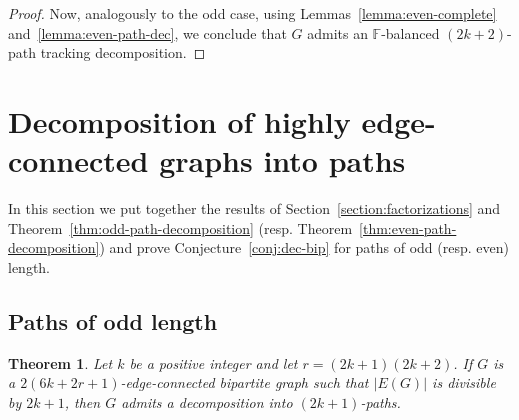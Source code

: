 \documentclass[12pt,reqno,a4paper]{amsart}
\newtheorem{theorem}{Theorem}[section]
\begin{document}
\begin{proof}
Now, analogously to the odd case, using Lemmas~\ref{lemma:even-complete} and~\ref{lemma:even-path-dec}, we conclude that \(G\) admits an \(\mathbb{F}\)-balanced $(2k+2)$-path tracking decomposition.
\end{proof}



\section{Decomposition of highly edge-connected graphs into 
paths}\label{section:high}


In this section we put together the results of 
Section~\ref{section:factorizations}
and Theorem~\ref{thm:odd-path-decomposition}
(resp. Theorem~\ref{thm:even-path-decomposition}) and prove 
Conjecture~\ref{conj:dec-bip} for paths of odd (resp. even) length.

\subsection{Paths of odd length}


\begin{theorem}\label{thm:high-odd}
	Let \(k\) be a positive integer and let \(r = (2k+1)(2k+2)\). If 
\(G\) is a \(2(6k + 2r+1)\)-edge-connected bipartite graph such that \(|E(G)|\) 
is divisible by \(2k+1\), 
	then \(G\) admits a decomposition into \((2k+1)\)-paths.
\end{theorem}

\end{document}
